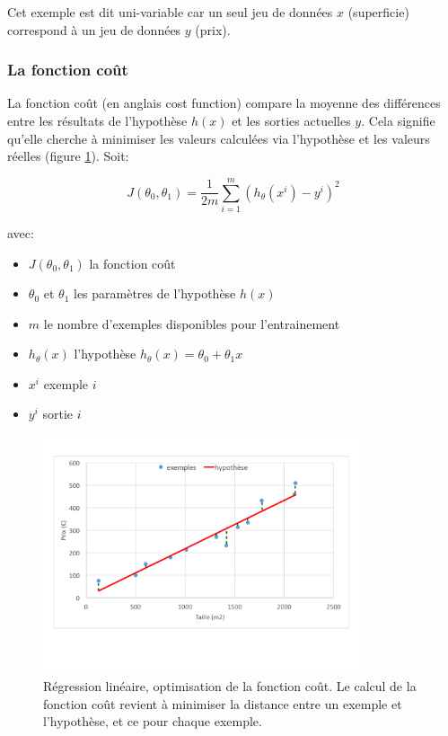 Cet exemple est dit uni-variable car un seul jeu de données $x$ (superficie) correspond à un jeu de données $y$ (prix).


\subsubsection{La fonction coût}
La fonction coût (en anglais cost function) compare la moyenne des différences entre les résultats de l'hypothèse $h(x)$ et les sorties actuelles $y$. Cela signifie qu'elle cherche à minimiser les valeurs calculées via l'hypothèse et les valeurs réelles (figure \ref{fig:Régression linéaire, optimisation de la fonction coût}). 
Soit: 

\begin{equation}
	J(\theta_0,\theta_1) = \frac{1}{2m}\sum_{i=1}^{m}(h_\theta(x^i)-y^i)^2
\end{equation}

avec:
\begin{itemize}
	\item $J(\theta_0,\theta_1)$ la fonction coût
	\item $\theta_0$ et $\theta_1$ les paramètres de l'hypothèse $h(x)$
	\item $m$ le nombre d'exemples disponibles pour l'entrainement 
	\item $h_\theta(x)$ l'hypothèse $h_\theta (x) = \theta_0 + \theta_1 x$
	\item $x^i$ exemple $i$
	\item $y^i$ sortie $i$
\end{itemize}

\begin{figure}[h]
	\centering\includegraphics[height=7cm]{images/cost.png}
	\caption[Régression linéaire, optimisation de la fonction coût]{Régression linéaire, optimisation de la fonction coût. Le calcul de la fonction coût revient à minimiser la distance entre un exemple et l'hypothèse, et ce pour chaque exemple.}
	\label{fig:Régression linéaire, optimisation de la fonction coût}
\end{figure}


